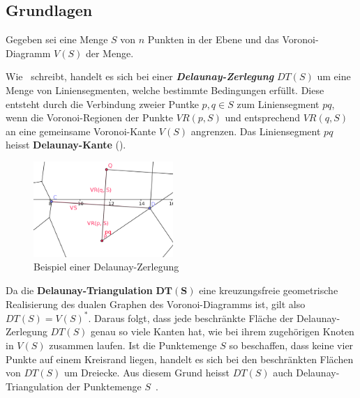 \subsection{Grundlagen}
Gegeben sei eine Menge $S$ von $n$ Punkten in der Ebene und das Voronoi-Diagramm $V(S)$ der Menge.

Wie~\citeauthor{klein2005algorithmischegeometrie} schreibt, handelt es sich bei einer \textbf{\textit{Delaunay-Zerlegung}} $DT(S)$ um eine Menge von Liniensegmenten, welche bestimmte Bedingungen erfüllt. Diese entsteht durch die Verbindung zweier Puntke $p,q \in S$ zum Liniensegment $pq$, wenn die Voronoi-Regionen der Punkte $VR(p,S)$ und entsprechend $VR(q,S)$ an eine gemeinsame Voronoi-Kante $V(S)$ angrenzen. Das Liniensegment $pq$ heisst \textbf{Delaunay-Kante} (\citeyear[S. 231]{klein2005algorithmischegeometrie}).

\newpage

\begin{figure}[h]
\centering
\includegraphics[width=200px]{images/delaunay_zerlegung_beispiel.png}
\caption{Beispiel einer Delaunay-Zerlegung\protect\footnotemark}
\label{fig:delaunayPartition}
\end{figure}

Da die \textbf{Delaunay-Triangulation} $\bm{DT(S)}$ eine kreuzungsfreie geometrische Realisierung des dualen Graphen des Voronoi-Diagramms ist, gilt also $DT(S) = V(S)^*$.
Daraus folgt, dass jede beschränkte Fläche der Delaunay-Zerlegung $DT(S)$ genau so viele Kanten hat, wie bei ihrem zugehörigen Knoten in $V(S)$ zusammen laufen.
Ist die Punktemenge $S$ so beschaffen, dass keine vier Punkte auf einem Kreisrand liegen, handelt es sich bei den beschränkten Flächen von $DT(S)$ um Dreiecke.
Aus diesem Grund heisst $DT(S)$ auch Delaunay-Triangulation der Punktemenge $S$~\parencite[S. 231 bis 237]{klein2005algorithmischegeometrie}.

